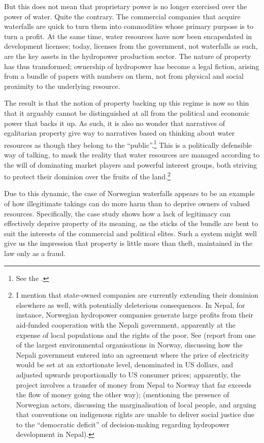 {But this does not mean that proprietary power is no longer exercised over the power of water. Quite the contrary. The commercial companies that acquire waterfalls are quick to turn them into commodities whose primary purpose is to turn a profit. At the same time, water resources have now been encapsulated in development licenses; today, licenses from the government, not waterfalls as such, are the key assets in the hydropower production sector. The nature of property has thus transformed; ownership of hydropower has become a legal fiction, arising from a bundle of papers with numbers on them, not from physical and social proximity to the underlying resource.

The result is that the notion of property backing up this regime is now so thin that it arguably cannot be distinguished at all from the political and economic power that backs it up. As such, it is also no wonder that narratives of egalitarian property give way to narratives based on thinking about water resources as though they belong to the ``public''.\footnote{See the \dni\cite[1]{ica17}.} This is a politically defensible way of talking, to mask the reality that water resources are managed according to the will of dominating market players and powerful interest groups, both striving to protect their dominion over the fruits of the land.\footnote{I mention that state-owned companies are currently extending their dominion elsewhere as well, with potentially deleterious consequences. In Nepal, for instance, Norwegian hydropower companies generate large profits from their aid-funded cooperation with the Nepali government, apparently at the expense of local populations and the rights of the poor. See \cite{gaarder15} (report from one of the largest environmental organisations in Norway, discussing how the Nepali government entered into an agreement where the price of electricity would be set at an extortionate level, denominated in US dollars, and adjusted upwards proportionally to US consumer prices; apparently, the project involves a transfer of money from Nepal to Norway that far exceeds the flow of money going the other way); \cite[644]{peris12} (mentioning the presence of Norwegian actors, discussing the marginalisation of local people, and arguing that conventions on indigenous rights are unable to deliver social justice due to the ``democratic deficit'' of decision-making regarding hydropower development in Nepal).}

Due to this dynamic, the case of Norwegian waterfalls appears to be an example of how illegitimate takings can do more harm than to deprive owners of valued resources. Specifically, the case study shows how a lack of legitimacy can effectively deprive property of its meaning, as the sticks of the 
bundle are bent to suit the interests of the commercial and political elites. Such a system might well give us the impression that property is little more than theft, maintained in the law only as a fraud.

}
